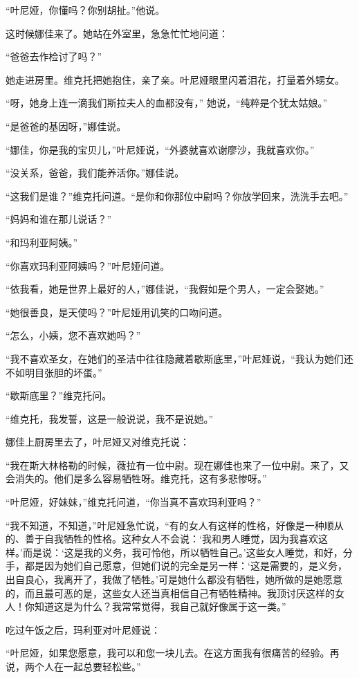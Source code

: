 “叶尼娅，你懂吗？你别胡扯。”他说。

这时候娜佳来了。她站在外室里，急急忙忙地问道：

“爸爸去作检讨了吗？”

她走进房里。维克托把她抱住，亲了亲。叶尼娅眼里闪着泪花，打量着外甥女。

“呀，她身上连一滴我们斯拉夫人的血都没有，” 她说，“纯粹是个犹太姑娘。”

“是爸爸的基因呀，”娜佳说。

“娜佳，你是我的宝贝儿，”叶尼娅说，“外婆就喜欢谢廖沙，我就喜欢你。”

“没关系，爸爸，我们能养活你。”娜佳说。

“这我们是谁？”维克托问道。“是你和你那位中尉吗？你放学回来，洗洗手去吧。”

“妈妈和谁在那儿说话？”

“和玛利亚阿姨。”

“你喜欢玛利亚阿姨吗？”叶尼娅问道。

“依我看，她是世界上最好的人，”娜佳说，“我假如是个男人，一定会娶她。”

“她很善良，是天使吗？”叶尼娅用讥笑的口吻问道。

“怎么，小姨，您不喜欢她吗？”

“我不喜欢圣女，在她们的圣洁中往往隐藏着歇斯底里，”叶尼娅说，“我认为她们还不如明目张胆的坏蛋。”

“歇斯底里？”维克托问。

“维克托，我发誓，这是一般说说，我不是说她。”

娜佳上厨房里去了，叶尼娅又对维克托说：

“我在斯大林格勒的时候，薇拉有一位中尉。现在娜佳也来了一位中尉。来了，又会消失的。他们是多么容易牺牲呀。维克托，这有多悲惨呀。”

“叶尼娅，好妹妹，”维克托问道，“你当真不喜欢玛利亚吗？”

“我不知道，不知道，”叶尼娅急忙说，“有的女人有这样的性格，好像是一种顺从的、善于自我牺牲的性格。这种女人不会说：‘我和男人睡觉，因为我喜欢这样。’而是说：‘这是我的义务，我可怜他，所以牺牲自己。’这些女人睡觉，和好，分手，都是因为她们自己愿意，但她们说的完全是另一样：‘这是需要的，是义务，出自良心，我离开了，我做了牺牲。’可是她什么都没有牺牲，她所做的是她愿意的，而且最可恶的是，这些女人还当真相信自己有牺牲精神。我顶讨厌这样的女人！你知道这是为什么？我常常觉得，我自己就好像属于这一类。”

吃过午饭之后，玛利亚对叶尼娅说：

“叶尼娅，如果您愿意，我可以和您一块儿去。在这方面我有很痛苦的经验。再说，两个人在一起总要轻松些。”

